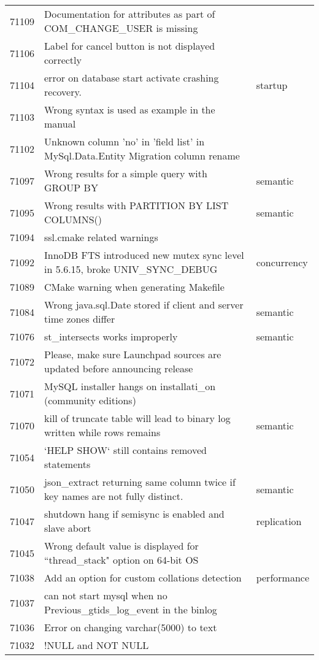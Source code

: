 \begin{longtable}[c]{p{1cm}p{8cm}p{3cm}}
71109 & Documentation for attributes as part of COM\_CHANGE\_USER is missing &  \\
71106 & Label for cancel button is not displayed correctly &  \\
71104 & error on database start activate crashing recovery. & startup \\
71103 & Wrong syntax is used as example in the manual &  \\
71102 & Unknown column 'no' in 'field list' in MySql.Data.Entity Migration column rename &  \\
71097 & Wrong results for a simple query with GROUP BY & semantic \\
71095 & Wrong results with PARTITION BY LIST COLUMNS() & semantic \\
71094 & ssl.cmake related warnings &  \\
71092 & InnoDB FTS introduced new mutex sync level in 5.6.15, broke UNIV\_SYNC\_DEBUG & concurrency \\
71089 & CMake warning when generating Makefile &  \\
71084 & Wrong java.sql.Date stored if client and server time zones differ & semantic \\
71076 & st\_intersects works improperly & semantic \\
71072 & Please, make sure Launchpad sources are updated before announcing release &  \\
71071 & MySQL installer hangs on installati\_on (community editions) &  \\
71070 & kill of truncate table will lead to binary log written while rows remains & semantic \\
71054 & `HELP SHOW` still contains removed statements &  \\
71050 & json\_extract returning same column twice if key names are not fully distinct. & semantic \\
71047 & shutdown hang if semisync is enabled and slave abort & replication \\
71045 & Wrong default value is displayed for ``thread\_stack" option on 64-bit OS &  \\
71038 & Add an option for custom collations detection & performance \\
71037 & can not start mysql when no Previous\_gtids\_log\_event in the binlog &  \\
71036 & Error on changing varchar(5000) to text &  \\
71032 & !NULL and NOT NULL &  \\

\end{longtable}
